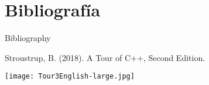 \documentclass{beamer}
\begin{document}
\section{Bibliografía}

\begin{frame}{Bibliography}

Stroustrup, B. (2018). A Tour of C++, Second Edition.


\begin{center}
      \texttt{[image: Tour3English-large.jpg]}

\end{center}
    
\end{frame}
\end{document}
